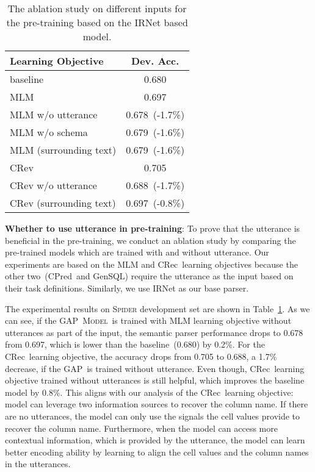 \documentclass[letterpaper]{article} \usepackage{aaai21}  \usepackage{times}  \usepackage{helvet} \usepackage{courier}  \usepackage[hyphens]{url}  \usepackage{graphicx} \usepackage{booktabs}
\newcommand{\modelname}{\textsc{GAP~}}
\newcommand{\modelnamelm}{\textsc{GAP~Model}}
\newcommand{\colpred}{CPred}
\newcommand{\colrec}{CRec}
\newcommand{\gensql}{GenSQL}
\begin{document}
\begin{table}[t]
  \centering
  \small
    \begin{tabular}{lc}
    \toprule
    Learning Objective & Dev. Acc. \\
    \midrule 
    baseline & 0.680 \\
    \midrule
    MLM   & 0.697 \\
    MLM w/o utterance & 0.678~(-1.7\%) \\
    MLM w/o schema & 0.679~(-1.6\%) \\
    MLM (surrounding text) & 0.679~(-1.6\%) \\
    \midrule
    CRev & 0.705 \\
    CRev w/o utterance & 0.688~(-1.7\%) \\
    CRev (surrounding text) & 0.697~(-0.8\%) \\
    \bottomrule
    \end{tabular}\caption{The ablation study on different inputs for the pre-training based on the IRNet based model.}
  \label{tab:ablation:nlsentence}\vspace{-0.3cm}
\end{table}

\smallskip \noindent \textbf{Whether to use utterance in pre-training}: To prove that the utterance is beneficial in the pre-training,
we conduct an ablation study by comparing the pre-trained models which are trained with and without utterance.
Our experiments are based on the MLM and \colrec~learning objectives because the other two~(\colpred~and \gensql) require the utterance as the input based on their task definitions.
Similarly, we use IRNet as our base parser.

The experimental results on \textsc{Spider} development set are shown in Table~\ref{tab:ablation:nlsentence}.
As we can see, if the \modelnamelm~is trained with MLM learning objective without utterances as part of the input, the semantic parser performance drops to 0.678 from 0.697, which is lower than the baseline~(0.680) by 0.2\%.
For the \colrec~learning objective, the accuracy drops from 0.705 to 0.688, a 1.7\% decrease, if the \modelname is trained without utterance.
Even though, \colrec~learning objective trained without utterances is still helpful, which improves the baseline model by 0.8\%.
This aligns with our analysis of the \colrec~learning objective: model can leverage two information sources to recover the column name.
If there are no utterances, the model can only use the signals the cell values provide to recover the column name.
Furthermore, when the model can access more contextual information, which is provided by the utterance, the model can learn better encoding ability by learning to align the cell values and the column names in the utterances.
\end{document}
